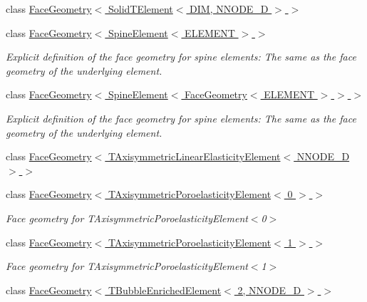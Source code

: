 \begin{DoxyCompactItemize}
class \hyperlink{classoomph_1_1FaceGeometry_3_01SolidTElement_3_01DIM_00_01NNODE__1D_01_4_01_4}{Face\+Geometry$<$ Solid\+T\+Element$<$ D\+I\+M, N\+N\+O\+D\+E\+\_\+D $>$ $>$}
\item 
class \hyperlink{classoomph_1_1FaceGeometry_3_01SpineElement_3_01ELEMENT_01_4_01_4}{Face\+Geometry$<$ Spine\+Element$<$ E\+L\+E\+M\+E\+N\+T $>$ $>$}
\begin{DoxyCompactList}\small\item\em Explicit definition of the face geometry for spine elements\+: The same as the face geometry of the underlying element. \end{DoxyCompactList}\item 
class \hyperlink{classoomph_1_1FaceGeometry_3_01SpineElement_3_01FaceGeometry_3_01ELEMENT_01_4_01_4_01_4}{Face\+Geometry$<$ Spine\+Element$<$ Face\+Geometry$<$ E\+L\+E\+M\+E\+N\+T $>$ $>$ $>$}
\begin{DoxyCompactList}\small\item\em Explicit definition of the face geometry for spine elements\+: The same as the face geometry of the underlying element. \end{DoxyCompactList}\item 
class \hyperlink{classoomph_1_1FaceGeometry_3_01TAxisymmetricLinearElasticityElement_3_01NNODE__1D_01_4_01_4}{Face\+Geometry$<$ T\+Axisymmetric\+Linear\+Elasticity\+Element$<$ N\+N\+O\+D\+E\+\_\+D $>$ $>$}
\item 
class \hyperlink{classoomph_1_1FaceGeometry_3_01TAxisymmetricPoroelasticityElement_3_010_01_4_01_4}{Face\+Geometry$<$ T\+Axisymmetric\+Poroelasticity\+Element$<$ 0 $>$ $>$}
\begin{DoxyCompactList}\small\item\em Face geometry for T\+Axisymmetric\+Poroelasticity\+Element$<$0$>$ \end{DoxyCompactList}\item 
class \hyperlink{classoomph_1_1FaceGeometry_3_01TAxisymmetricPoroelasticityElement_3_011_01_4_01_4}{Face\+Geometry$<$ T\+Axisymmetric\+Poroelasticity\+Element$<$ 1 $>$ $>$}
\begin{DoxyCompactList}\small\item\em Face geometry for T\+Axisymmetric\+Poroelasticity\+Element$<$1$>$ \end{DoxyCompactList}\item 
class \hyperlink{classoomph_1_1FaceGeometry_3_01TBubbleEnrichedElement_3_012_00_01NNODE__1D_01_4_01_4}{Face\+Geometry$<$ T\+Bubble\+Enriched\+Element$<$ 2, N\+N\+O\+D\+E\+\_\+D $>$ $>$}

\end{DoxyCompactItemize}
